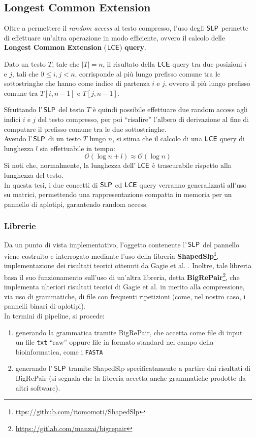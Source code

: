 \subsection{Longest Common Extension}
Oltre a permettere il \textit{random access} al testo compresso, 
l'uso degli $\mbox{\rm {\sf SLP}}$ permette di effettuare 
un'altra operazione in modo efficiente, ovvero il calcolo delle \textbf{Longest
  Common Extension} ($\mbox{\rm {\sf LCE}}$) \textbf{query}.
\begin{definizione}
  Dato un testo $T$, tale che $|T|=n$, il risultato della $\mbox{\rm {\sf LCE}}$ query tra
  due posizioni $i$ e $j$, tali che $0\leq i,j<n$, corrisponde al più lungo
  prefisso comune tra le sottostringhe che hanno come indice di partenza $i$ e
  $j$, ovvero il più lungo prefisso comune tra $T[i,n-1]$ e $T[j,n-1]$.
\end{definizione}
Sfruttando l'$\,\mbox{\rm {\sf SLP}}$ del testo $T$ è quindi possibile effettuare due
random access agli indici $i$ e $j$ del testo compresso, per poi ``risalire''
l'albero di derivazione al fine di computare il prefisso comune tra le due
sottostringhe.\\ 
Avendo l'$\,\mbox{\rm {\sf SLP}}$ di un testo $T$ lungo $n$, si stima che il calcolo di una
$\mbox{\rm {\sf LCE}}$ query di lunghezza $l$ sia
effettuabile in tempo: 
\begin{equation}
  \label{eq:lcetime}
  \mathcal{O}\left(\log n+l\right)\approx\mathcal{O}\left(\log n\right)
\end{equation}
Si noti che, normalmente, la lunghezza dell'$\,\mbox{\rm {\sf LCE}}$ è trascurabile rispetto
alla lunghezza 
del testo.\\ 
In questa tesi, i due concetti di $\mbox{\rm {\sf SLP}}$ ed $\mbox{\rm {\sf LCE}}$ query verranno generalizzati
all'uso su matrici, permettendo una rappresentazione compatta in 
memoria per un pannello di aplotipi, garantendo random access.
\subsubsection{Librerie}
Da un punto di vista implementativo, l'oggetto contenente  l'$\,\mbox{\rm {\sf SLP}}$ del
pannello viene costruito e interrogato mediante l'uso della libreria
\textbf{ShapedSlp}\footnote{\url{ttps://github.com/itomomoti/ShapedSlp}},
implementazione dei risultati teorici ottenuti da 
Gagie et al. \cite{slpgagie}. Inoltre, tale libreria basa il suo funzionamento
sull'uso di un'altra libreria, detta
\textbf{BigRePair}\footnote{\url{https://gitlab.com/manzai/bigrepair}}, che 
implementa ulteriori risultati teorici di Gagie et al. \cite{rpair} in merito
alla compressione, via uso di grammatiche, di file con frequenti ripetizioni
(come, nel nostro caso, i pannelli binari di aplotipi).\\
In termini di pipeline, si procede:
\begin{enumerate}
  \item generando la grammatica tramite BigRePair, che accetta
  come file di input un file \texttt{txt} ``raw'' oppure file in formato
  standard nel campo della bioinformatica, come i \texttt{FASTA}
  \item generando l'$\,\mbox{\rm {\sf SLP}}$ tramite ShapedSlp specificatamente a
  partire dai risultati di BigRePair (si segnala che la libreria
  accetta anche grammatiche prodotte da altri software).
\end{enumerate}